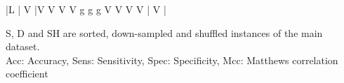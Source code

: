 \begin{table}[ht]
\begin{tabular}{|L | V |V V V V g g g V V V V | V |}
        \hline\hline
        
         {\footnotesize{
            S, D and SH are sorted, down-sampled and shuffled instances of the main dataset.
        }}\\
         {\footnotesize{
            Acc: Accuracy, Sens: Sensitivity, Spec: Specificity, Mcc: Matthews correlation coefficient
        }}\\

        \hline
        
       

    \end{tabular}
    \captionsetup{font=small,width=14cm}
    \caption{The average sensitivity, specificity, accuracy, and MCC values 
    for scikit-learn prediction-based models for amino acid composition (AAC).}
    \label{tab:table1}
    
\end{table}